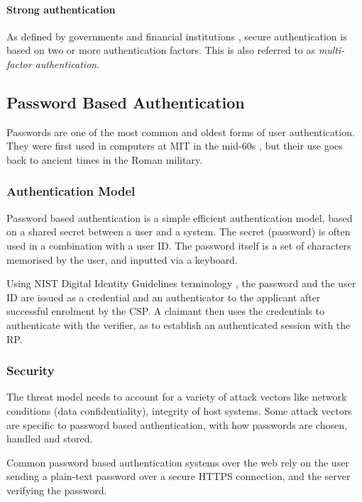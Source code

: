 \paragraph{Strong authentication} As defined by governments and financial institutions \cite{schaeffer2010national, ecb2013recommendations}, secure authentication is based on two or more authentication factors. 
This is also referred to as \textit{multi-factor authentication}.

\subsection{Password Based Authentication}

Passwords are one of the most common and oldest forms of user authentication. 
They were first used in computers at MIT in the mid-60s \cite{mcmillan2012password}, but their use goes back to ancient times in the Roman military.

\subsubsection{Authentication Model}

Password based authentication is a simple efficient authentication model, based on a shared secret between a user and a system. 
The secret (password) is often used in a combination with a user ID. 
The password itself is a set of characters memorised by the user, and inputted via a keyboard.

Using NIST Digital Identity Guidelines terminology \cite{grassi2017}, the password and the user ID are issued as a credential and an authenticator to the applicant after successful enrolment by the CSP.
A claimant then uses the credentials to authenticate with the verifier, as to establish an authenticated session with the RP.


\subsubsection{Security}

The threat model needs to account for a variety of attack vectors like network conditions (data confidentiality), integrity of host systems.
Some attack vectors are specific to password based authentication, with how passwords are chosen, handled and stored.

Common password based authentication systems over the web rely on the user sending a plain-text password over a secure HTTPS connection, and the server verifying the password.


